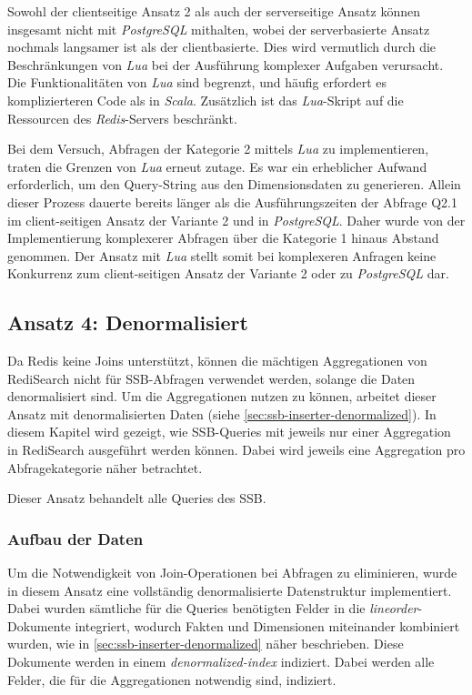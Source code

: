 Sowohl der clientseitige Ansatz 2 als auch der serverseitige Ansatz können insgesamt nicht mit \emph{PostgreSQL} mithalten, wobei der serverbasierte Ansatz nochmals langsamer ist als der clientbasierte. Dies wird vermutlich durch die Beschränkungen von \emph{Lua} bei der Ausführung komplexer Aufgaben verursacht. Die Funktionalitäten von \emph{Lua} sind begrenzt, und häufig erfordert es komplizierteren Code als in \emph{Scala}. Zusätzlich ist das \emph{Lua}-Skript auf die Ressourcen des \emph{Redis}-Servers beschränkt.

Bei dem Versuch, Abfragen der Kategorie 2 mittels \emph{Lua} zu implementieren, traten die Grenzen von \emph{Lua} erneut zutage. Es war ein erheblicher Aufwand erforderlich, um den Query-String aus den Dimensionsdaten zu generieren. Allein dieser Prozess dauerte bereits länger als die Ausführungszeiten der Abfrage Q2.1 im client-seitigen Ansatz der Variante 2 und in \emph{PostgreSQL}. Daher wurde von der Implementierung komplexerer Abfragen über die Kategorie 1 hinaus Abstand genommen. Der Ansatz mit \emph{Lua} stellt somit bei komplexeren Anfragen keine Konkurrenz zum client-seitigen Ansatz der Variante 2 oder zu \emph{PostgreSQL} dar.


\subsection{Ansatz 4: Denormalisiert}
Da Redis keine Joins unterstützt, können die mächtigen Aggregationen von RediSearch nicht für SSB-Abfragen verwendet werden, solange die Daten denormalisiert sind. Um die Aggregationen nutzen zu können, arbeitet dieser Ansatz mit denormalisierten Daten (siehe \cref{sec:ssb-inserter-denormalized}).
In diesem Kapitel wird gezeigt, wie SSB-Queries mit jeweils nur einer Aggregation in RediSearch ausgeführt werden können. Dabei wird jeweils eine Aggregation pro Abfragekategorie näher betrachtet.

Dieser Ansatz behandelt alle Queries des SSB.

\subsubsection{Aufbau der Daten}
Um die Notwendigkeit von Join-Operationen bei Abfragen zu eliminieren, wurde in diesem Ansatz eine vollständig denormalisierte Datenstruktur implementiert. Dabei wurden sämtliche für die Queries benötigten Felder in die \emph{lineorder}-Dokumente integriert, wodurch Fakten und Dimensionen miteinander kombiniert wurden, wie in \cref{sec:ssb-inserter-denormalized} näher beschrieben. Diese Dokumente werden in einem \emph{denormalized-index} indiziert. Dabei werden alle Felder, die für die Aggregationen notwendig sind, indiziert.

